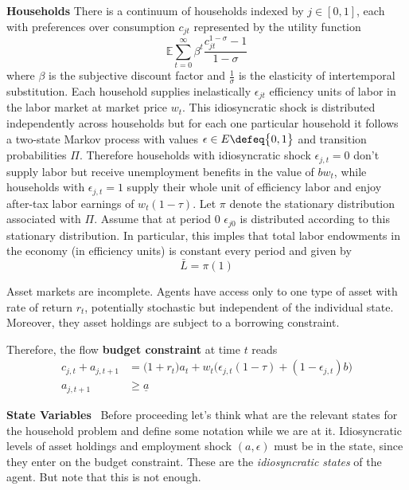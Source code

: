 \documentclass[a4paper,10pt]{article}  %
\begin{document}
\textbf{Households} \quad There is a continuum of households indexed by $ j\in [0,1] $, each with preferences over consumption
$ c_{jt} $ represented by the utility function
\begin{equation*}
   \label{eq:util}
   \mathbb{E}  \sum_{t=0}^{\infty} \beta^t \frac{ c_{jt}^{1- \sigma} -1}{ 1- \sigma }
\end{equation*}
where $ \beta $ is the subjective discount factor and $ \frac{1}{\sigma} $ is the elasticity of intertemporal substitution.
%
Each household supplies inelastically $ \epsilon_{jt} $ efficiency units of labor in the labor market at market price $w_t$. This
idiosyncratic shock is distributed independently across households but for each one particular household it follows a two-state Markov
process with values $\epsilon \in E\defeq  \big\{ 0,1 \big\} $ and transition probabilities $ \Pi $. Therefore households with
idiosyncratic shock $ \epsilon_{j,t} = 0 $ don't supply labor but receive unemployment benefits in the value of $ bw_t $, while
households with $\epsilon_{j,t}=1$ supply their whole unit of efficiency labor and enjoy after-tax labor earnings of $ w_t ( 1-\tau )
$. 
Let $\pi$ denote the stationary distribution associated with $\Pi$. Assume that at period 0 $\epsilon_{j0}$ is distributed according to this stationary distribution. 
In particular, this imples that total labor endowments in the economy (in efficiency units) is constant every period and given by
\[
   \bar{L} = \pi(1)
\]

Asset markets are incomplete.
Agents have access only to one type of asset with rate of return $r_t$, potentially stochastic
but independent of the individual state. Moreover, they asset holdings are subject to a borrowing constraint.


Therefore, the flow \textbf{budget constraint} at time $t$ reads
\begin{align*}
   \label{eq:budget_const}
   c_{j,t} + a_{j,t+1} & = \Big( 1 + r_t \Big) a_t + w_t \Big( \epsilon_{j,t} ( 1-\tau ) + ( 1-\epsilon_{j,t} )b \Big) \\
   a_{j,t+1}           & \ge \underline{a}
\end{align*}

\textbf{State Variables} \
Before proceeding let's think what are the relevant states for the household problem and define some notation
while we are at it.
Idiosyncratic levels of asset holdings and employment shock $ ( a, \epsilon ) $ must be in the state, since they enter
on the budget constraint. These are the \emph{idiosyncratic states} of the agent. But note that this is not enough.
\end{document}
